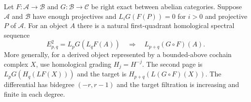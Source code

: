 \begin{theorem}
\label{res:G06}
Let \(F:\mathcal A\to\mathcal B\) and \(G:\mathcal B\to\mathcal C\)
be right exact between abelian categories. Suppose \(\mathcal A\) and
\(\mathcal B\) have enough projectives and \(L_iG(F(P))=0\) for
\(i>0\) and projective \(P\) of \(\mathcal A\). For an object \(A\)
there is a natural first-quadrant homological spectral sequence
\[
      E^2_{p,q}=L_pG(L_qF(A))
       \quad\Longrightarrow\quad L_{p+q}(G\circ F)(A).
\]
More generally, for a derived object represented by a bounded-above
cochain complex \(X\), use homological grading \(H_j=H^{-j}\).
The second page is \(L_pG(H_q(LF(X)))\) and the target is
\(H_{p+q}(L(G\circ F)(X))\). The differential has bidegree
\((-r,r-1)\) and the target filtration is increasing and finite
in each degree.
\end{theorem}

